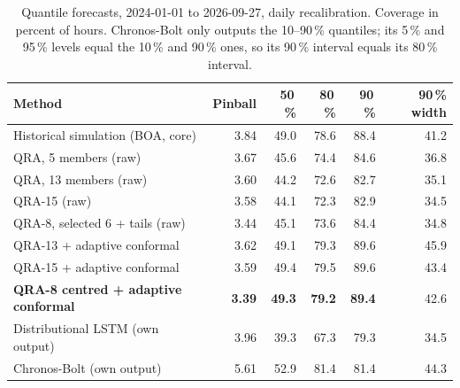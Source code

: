 \documentclass[11pt,a4paper]{article}
\begin{document}
\begin{table}[ht]
\centering\small
\begin{tabular}{lrrrrr}
\toprule
Method & Pinball & 50\,\% & 80\,\% & 90\,\% & 90\,\% width\\
\midrule
Historical simulation (BOA, core) & 3.84 & 49.0 & 78.6 & 88.4 & 41.2\\
QRA, 5 members (raw) & 3.67 & 45.6 & 74.4 & 84.6 & 36.8\\
QRA, 13 members (raw) & 3.60 & 44.2 & 72.6 & 82.7 & 35.1\\
QRA-15 (raw) & 3.58 & 44.1 & 72.3 & 82.9 & 34.5\\
QRA-8, selected 6 + tails (raw) & 3.44 & 45.1 & 73.6 & 84.4 & 34.8\\
QRA-13 + adaptive conformal & 3.62 & 49.1 & 79.3 & 89.6 & 45.9\\
QRA-15 + adaptive conformal & 3.59 & 49.4 & 79.5 & 89.6 & 43.4\\
\textbf{QRA-8 centred + adaptive conformal} & \textbf{3.39} & \textbf{49.3} & \textbf{79.2} & \textbf{89.4} & 42.6\\
Distributional LSTM (own output) & 3.96 & 39.3 & 67.3 & 79.3 & 34.5\\
Chronos-Bolt (own output) & 5.61 & 52.9 & 81.4 & 81.4 & 44.3\\
\bottomrule
\end{tabular}
\caption{Quantile forecasts, 2024-01-01 to 2026-09-27, daily recalibration. Coverage in percent of hours. Chronos-Bolt only outputs the 10--90\,\% quantiles; its 5\,\% and 95\,\% levels equal the 10\,\% and 90\,\% ones, so its 90\,\% interval equals its 80\,\% interval.}
\label{tab:prob}
\end{table}
\end{document}
